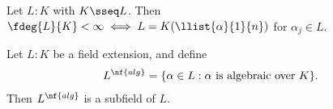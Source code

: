 \documentclass[a4paper]{article}
\begin{document}
\begin{tcorollary}
  Let \( L:K \) with \( K\sseq L \).
  Then \( \fdeg{L}{K} < \infty \iff L=K(\llist{\alpha}{1}{n}) \) for \( \alpha_j\in L \).
\end{tcorollary}

\begin{ttheorem}
  Let \( L:K \) be a field extension, and define \begin{align*}
    L^{\nf{alg}}=\{\alpha\in L : \alpha \text{ is algebraic over } K\}.
  \end{align*}
  Then \( L^{\nf{alg}} \) is a subfield of \( L \).
\end{ttheorem}
\end{document}
